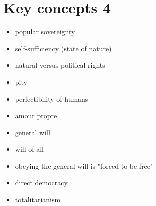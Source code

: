 \section{Key concepts 4}

\begin{itemize}
	\item popular sovereignty
	\item self-sufficiency (state of nature)
	\item natural versus political rights
	\item pity
	\item perfectibility of humans
	\item amour propre
	\item general will
	\item will of all
	\item obeying the general will is "forced to be free"
	\item direct democracy
	\item totalitarianism
\end{itemize}
